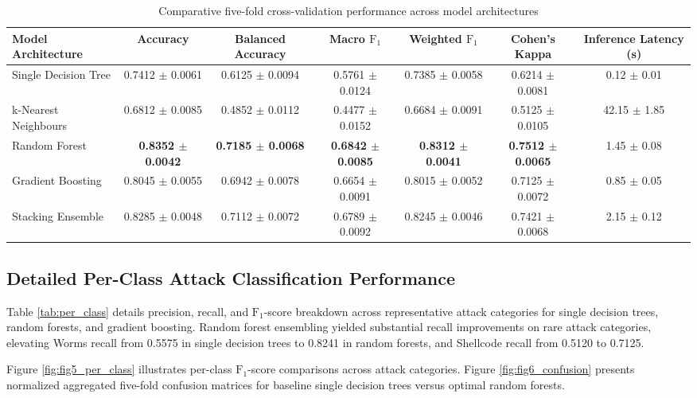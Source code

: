 \documentclass[10pt,conference,compsoc]{IEEEtran}
\begin{document}
\begin{table}[t]
\caption{Comparative five-fold cross-validation performance across model architectures}
\label{tab:model_comparison}
\centering
\setlength{\tabcolsep}{4.5pt}
\begin{tabular}{lcccccc}
\toprule
\textbf{Model Architecture} & \textbf{Accuracy} & \textbf{Balanced Accuracy} & \textbf{Macro $\text{F}_1$} & \textbf{Weighted $\text{F}_1$} & \textbf{Cohen's Kappa} & \textbf{Inference Latency (s)} \\
\midrule
Single Decision Tree & 0.7412 $\pm$ 0.0061 & 0.6125 $\pm$ 0.0094 & 0.5761 $\pm$ 0.0124 & 0.7385 $\pm$ 0.0058 & 0.6214 $\pm$ 0.0081 & 0.12 $\pm$ 0.01 \\
k-Nearest Neighbours & 0.6812 $\pm$ 0.0085 & 0.4852 $\pm$ 0.0112 & 0.4477 $\pm$ 0.0152 & 0.6684 $\pm$ 0.0091 & 0.5125 $\pm$ 0.0105 & 42.15 $\pm$ 1.85 \\
Random Forest & \textbf{0.8352 $\pm$ 0.0042} & \textbf{0.7185 $\pm$ 0.0068} & \textbf{0.6842 $\pm$ 0.0085} & \textbf{0.8312 $\pm$ 0.0041} & \textbf{0.7512 $\pm$ 0.0065} & 1.45 $\pm$ 0.08 \\
Gradient Boosting & 0.8045 $\pm$ 0.0055 & 0.6942 $\pm$ 0.0078 & 0.6654 $\pm$ 0.0091 & 0.8015 $\pm$ 0.0052 & 0.7125 $\pm$ 0.0072 & 0.85 $\pm$ 0.05 \\
Stacking Ensemble & 0.8285 $\pm$ 0.0048 & 0.7112 $\pm$ 0.0072 & 0.6789 $\pm$ 0.0092 & 0.8245 $\pm$ 0.0046 & 0.7421 $\pm$ 0.0068 & 2.15 $\pm$ 0.12 \\
\bottomrule
\end{tabular}
\end{table}

\subsection{Detailed Per-Class Attack Classification Performance}
Table \ref{tab:per_class} details precision, recall, and $\text{F}_1$-score breakdown across representative attack categories for single decision trees, random forests, and gradient boosting. Random forest ensembling yielded substantial recall improvements on rare attack categories, elevating Worms recall from 0.5575 in single decision trees to 0.8241 in random forests, and Shellcode recall from 0.5120 to 0.7125.

Figure \ref{fig:fig5_per_class} illustrates per-class $\text{F}_1$-score comparisons across attack categories. Figure \ref{fig:fig6_confusion} presents normalized aggregated five-fold confusion matrices for baseline single decision trees versus optimal random forests.
\end{document}
